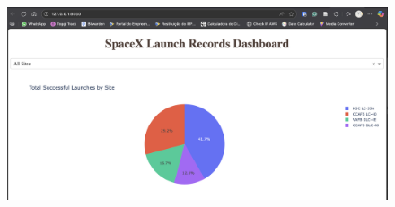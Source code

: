 \begin{figure}[htbp]
    \centering
    \captionsetup{justification = raggedright, singlelinecheck = false}
    \label{fig:interactive_successful_landing_outcome_pie_chart}
    \includegraphics[scale=0.25]{figures/interactive_successful_landing_outcome_pie_chart}
\end{figure}
